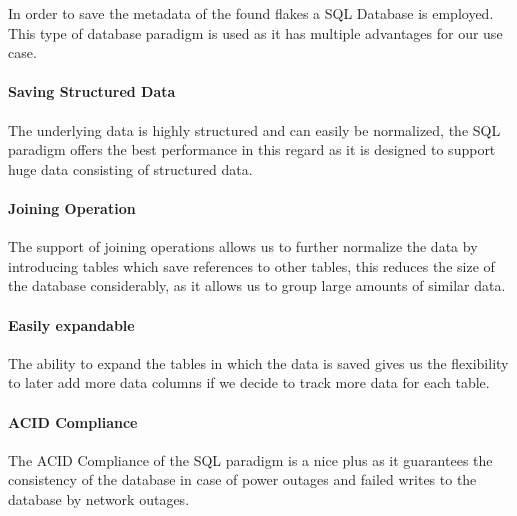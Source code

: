 In order to save the metadata of the found flakes a SQL Database is employed.
This type of database paradigm is used as it has multiple advantages for our use case.
\paragraph{Saving Structured Data}
The underlying data is highly structured and can easily be normalized, the SQL paradigm offers the best performance in this regard as it is designed to support huge data consisting of structured data.

\paragraph{Joining Operation}
The support of joining operations allows us to further normalize the data by introducing tables which save references to other tables, this reduces the size of the database considerably, as it allows us to group large amounts of similar data.

\paragraph{Easily expandable}
The ability to expand the tables in which the data is saved gives us the flexibility to later add more data columns if we decide to track more data for each table.

\paragraph{ACID Compliance}
The ACID Compliance of the SQL paradigm is a nice plus as it guarantees the consistency of the database in case of power outages and failed writes to the database by network outages.